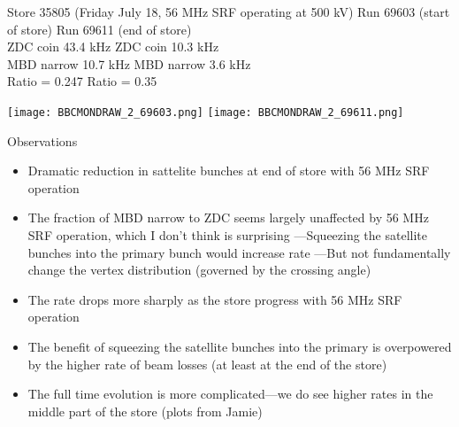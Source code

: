 \documentclass[aspectratio=169,compress,10pt]{beamer}
\begin{document}
\begin{frame}{Store 35805 (Friday July 18, 56 MHz SRF operating at 500 kV)}
Run 69603 (start of store) \hspace{3cm} Run 69611 (end of store) \\
ZDC coin 43.4 kHz \hspace{4cm} ZDC coin 10.3 kHz \\
MBD narrow 10.7 kHz \hspace{3.5cm} MBD narrow 3.6 kHz \\
Ratio = 0.247 \hspace{4.75cm} Ratio = 0.35
\begin{center}
\texttt{[image: BBCMONDRAW\_2\_69603.png]}
\texttt{[image: BBCMONDRAW\_2\_69611.png]}
\end{center}
\end{frame}


\begin{frame}{Observations}
\begin{itemize}
\item Dramatic reduction in sattelite bunches at end of store with 56 MHz SRF operation
\item The fraction of MBD narrow to ZDC seems largely unaffected by 56 MHz SRF operation,
which I don't think is surprising
\newline---Squeezing the satellite bunches into the primary bunch would increase rate
\newline---But not fundamentally change the vertex distribution (governed by the crossing angle)
\item The rate drops more sharply as the store progress with 56 MHz SRF operation
\item The benefit of squeezing the satellite bunches into the primary is overpowered
by the higher rate of beam losses (at least at the end of the store)
\item The full time evolution is more complicated---we do see higher rates in the middle part
of the store (plots from Jamie)
\end{itemize}
\end{frame}
\end{document}

